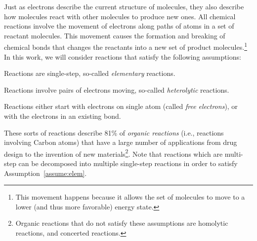 Just as electrons describe the current structure of molecules, they also describe how molecules react with other molecules to produce new ones. 
All chemical reactions involve the movement of electrons along paths of atoms in a set of reactant molecules. 
This movement causes the formation and breaking of chemical bonds that changes the reactants into a new set of product molecules.\footnote{This movement happens because it allows the set of molecules to move to a lower (and thus more favorable) energy state.} 
In this work, we will consider reactions that satisfy the following assumptions:
\begin{assumption}
Reactions are single-step, so-called \emph{elementary} reactions.
\label{assume:elem}
\end{assumption}

\begin{assumption}
Reactions involve pairs of electrons moving, so-called \emph{heterolytic} reactions.
\label{assume:het}
\end{assumption}

\begin{assumption}
Reactions either start with electrons on single atom (called \emph{free electrons}), or with the electrons in an existing bond.
\label{assume:atom_bond}
\end{assumption}

These sorts of reactions describe 81\% of \emph{organic reactions}\cite{herges1994coarctate} (i.e., reactions involving Carbon atoms) that have a large number of applications from drug design to the invention of new materials\cite{segler2018planning}\footnote{Organic reactions that do not satisfy these assumptions are homolytic reactions, and concerted reactions.}. 
Note that reactions which are multi-step can be decomposed into multiple single-step reactions in order to satisfy Assumption~\ref{assume:elem}.


